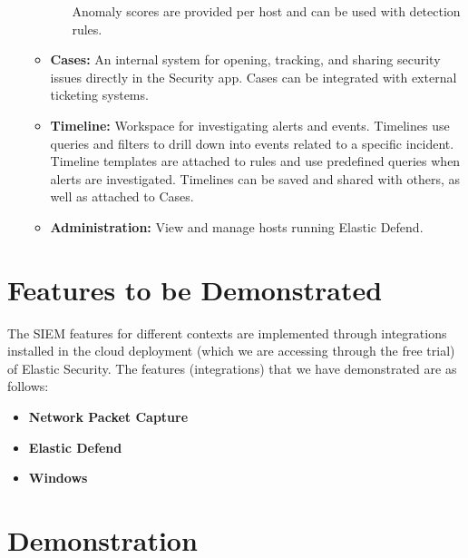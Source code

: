 \documentclass{report}
\begin{document}
\begin{itemize}
\begin{itemize}
\begin{itemize}
			Anomaly scores are provided per host and can be used with detection rules.
		\end{itemize}
		\item \textbf{Cases:} An internal system for opening, tracking, and sharing security issues directly in the Security app. 
		Cases can be integrated with external ticketing systems.
		\item \textbf{Timeline:} Workspace for investigating alerts and events. 
		Timelines use queries and filters to drill down into events related to a specific incident.
		Timeline templates are attached to rules and use predefined queries when alerts are investigated.
		Timelines can be saved and shared with others, as well as attached to Cases.
		\item \textbf{Administration:} View and manage hosts running Elastic Defend.
	\end{itemize}
\end{itemize}

\chapter{Features to be Demonstrated}
The SIEM features for different contexts are implemented through integrations installed in the cloud deployment 
(which we are accessing through the free trial) of Elastic Security.
The features (integrations) that we have demonstrated are as follows:
\begin{itemize}
	\item \textbf{Network Packet Capture} 
	\item \textbf{Elastic Defend}
        \item \textbf{Windows}
\end{itemize}

\chapter{Demonstration}
\end{document}
